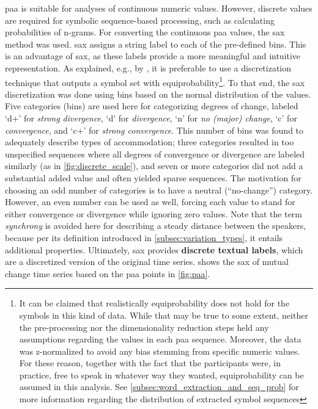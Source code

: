 \Ac{paa} is suitable for analyses of continuous numeric values.
However, discrete values are required for symbolic sequence-based processing, such as calculating probabilities of n-grams.
For converting the continuous \ac{paa} values, the \acl{sax} \citep[\acs{sax};][]{Lin2007experiencing} method was used.
\Acf{sax} assigns a string label to each of the pre-defined bins.
This is an advantage of \ac{sax}, as these labels provide a more meaningful and intuitive representation.
As explained, e.g., by \citet{Apostolico2003monotony}, it is preferable to use a discretization technique that outputs a symbol set with equiprobability\footnote{It can be claimed that realistically equiprobability does not hold for the symbols in this kind of data.
While that may be true to some extent, neither the pre-processing nor the dimensionality reduction steps held any assumptions regarding the values in each \ac{paa} sequence.
Moreover, the data was z-normalized to avoid any bias stemming from specific numeric values.
For these reason, together with the fact that the participants were, in practice, free to speak in whatever way they wanted, equiprobability can be assumed in this analysis.
See \cref{subsec:word_extraction_and_seq_prob} for more information regarding the distribution of extracted symbol sequences}.
To that end, the \ac{sax} discretization was done using bins based on the normal distribution of the values.
Five categories (bins) are used here for categorizing degrees of change, labeled \enquote*{d+} for \emph{strong divergence}, \enquote*{d} for \emph{divergence}, \enquote*{n} for \emph{no (major) change}, \enquote*{c} for \emph{convergence}, and \enquote*{c+} for \emph{strong convergence}.
This number of bins was found to adequately describe types of accommodation;
three categories resulted in too unspecified sequences where all degrees of convergence or divergence are labeled similarly (as in \cref{fig:discrete_scale}), and seven or more categories did not add a substantial added value and often yielded sparse sequences.
The motivation for choosing an odd number of categories is to have a neutral (\enquote{no-change}) category.
However, an even number can be used as well, forcing each value to stand for either convergence or divergence while ignoring zero values.
Note that the term \emph{synchrony} is avoided here for describing a steady distance between the speakers, because per its definition introduced in \cref{subsec:variation_types}, it entails additional properties.
Ultimately, \ac{sax} provides \textbf{discrete textual labels}, which are a discretized version of the original time series.
 shows the \ac{sax} of mutual change time series based on the \ac{paa} points in \cref{fig:paa}.

